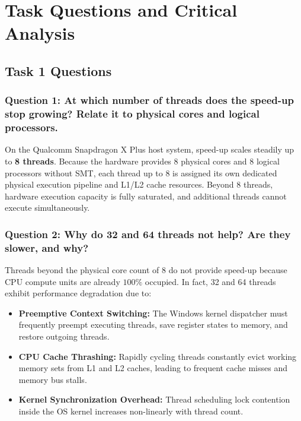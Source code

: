 \documentclass[12pt,a4paper]{article}
\begin{document}
\section{Task Questions and Critical Analysis}

\subsection{Task 1 Questions}

\subsubsection{Question 1: At which number of threads does the speed-up stop growing? Relate it to physical cores and logical processors.}
On the Qualcomm Snapdragon X Plus host system, speed-up scales steadily up to \textbf{8 threads}. Because the hardware provides 8 physical cores and 8 logical processors without SMT, each thread up to 8 is assigned its own dedicated physical execution pipeline and L1/L2 cache resources. Beyond 8 threads, hardware execution capacity is fully saturated, and additional threads cannot execute simultaneously.

\subsubsection{Question 2: Why do 32 and 64 threads not help? Are they slower, and why?}
Threads beyond the physical core count of 8 do not provide speed-up because CPU compute units are already $100\%$ occupied. In fact, 32 and 64 threads exhibit performance degradation due to:
\begin{itemize}
    \item \textbf{Preemptive Context Switching:} The Windows kernel dispatcher must frequently preempt executing threads, save register states to memory, and restore outgoing threads.
    \item \textbf{CPU Cache Thrashing:} Rapidly cycling threads constantly evict working memory sets from L1 and L2 caches, leading to frequent cache misses and memory bus stalls.
    \item \textbf{Kernel Synchronization Overhead:} Thread scheduling lock contention inside the OS kernel increases non-linearly with thread count.
\end{itemize}
\end{document}
